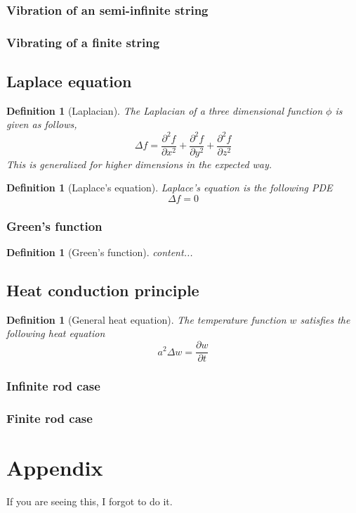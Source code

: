 \documentclass[oneside,11pt,pdftex,final]{book}%
\numberwithin{equation}{section}
\newtheorem{definition}[theorem]{Definition}
\numberwithin{section}{chapter}
\numberwithin{equation}{chapter}
\begin{document}
\subsection{Vibration of an semi-infinite string}
\subsection{Vibrating of a finite string}



\section{Laplace equation}
\begin{definition}[Laplacian]
	The Laplacian of a three dimensional function $ \phi $ is given as follows,
	\[ \Delta f= \frac{\partial^2 f}{\partial x^2}+\frac{\partial^2 f}{\partial y^2}+\frac{\partial^2 f}{\partial z^2} \]
	This is generalized for higher dimensions in the expected way.
\end{definition}

\begin{definition}[Laplace's equation]
	Laplace's equation is the following PDE
	\[ \Delta f = 0 \]
\end{definition}
\subsection{Green's function}
\begin{definition}[Green's function]
	content...
\end{definition}

\section{Heat conduction principle}
\begin{definition}[General heat equation]
	The temperature function $ w $ satisfies the following heat equation
	\[a^2 \Delta w = \frac{\partial w}{\partial t}\]
\end{definition}
\subsection{Infinite rod case}
\subsection{Finite rod case}


\backmatter

\chapter*{Appendix}
If you are seeing this, I forgot to do it.




\thispagestyle{empty}%
{\ }
\newpage
\end{document}
